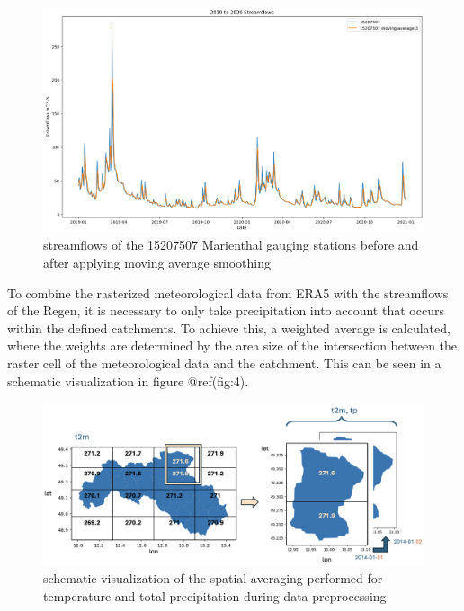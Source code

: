 \documentclass[
]{article}
\begin{document}
\begin{figure}

{\centering \includegraphics[width=500]{work/07-hydroLSTM/images/Moving_Average} 

}

\caption{streamflows of the 15207507 Marienthal gauging stations before and after applying moving average smoothing}\label{fig:3}
\end{figure}

To combine the rasterized meteorological data from ERA5 with the
streamflows of the Regen, it is necessary to only take precipitation
into account that occurs within the defined catchments. To achieve this,
a weighted average is calculated, where the weights are determined by
the area size of the intersection between the raster cell of the
meteorological data and the catchment. This can be seen in a schematic
visualization in figure @ref(fig:4).

\begin{figure}

{\centering \includegraphics[width=500]{work/07-hydroLSTM/images/spatial_averaging} 

}

\caption{schematic visualization of the spatial averaging performed for temperature and total precipitation during data preprocessing}\label{fig:4}
\end{figure}
\end{document}
